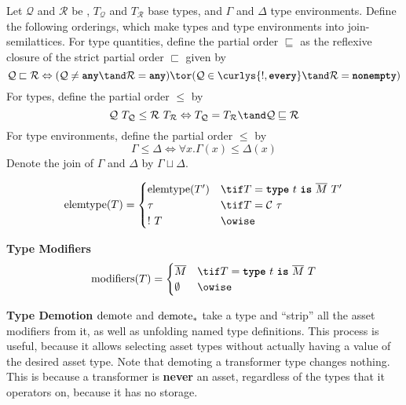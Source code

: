\documentclass[10pt]{article}
\begin{document}
\begin{definition}
    Let $\mathcal{Q}$ and $\mathcal{R}$ be \typeQuantities, $T_\mathcal{Q}$ and $T_\mathcal{R}$ base types, and $\Gamma$ and $\Delta$ type environments.
    Define the following orderings, which make types and type environments into join-semilattices.
    For type quantities, define the partial order $\sqsubseteq$ as the reflexive closure of the strict partial order $\sqsubset$ given by
    \[
        \mathcal{Q} \sqsubset \mathcal{R} \iff (\mathcal{Q} \neq \any \tand \mathcal{R} = \any) \tor (\mathcal{Q} \in \curlys{\exactlyone, \every} \tand \mathcal{R} = \nonempty)
    \]
    For types, define the partial order $\leq$ by
    \[
        \mathcal{Q}~T_\mathcal{Q} \leq \mathcal{R}~T_\mathcal{R} \iff T_\mathcal{Q} = T_\mathcal{R} \tand \mathcal{Q} \sqsubseteq \mathcal{R}
    \]
    For type environments, define the partial order $\leq$ by
    \[
        \Gamma \leq \Delta \iff \forall x. \Gamma(x) \leq \Delta(x)
    \]
    Denote the join of $\Gamma$ and $\Delta$ by $\Gamma \sqcup \Delta$.
\end{definition}

\begin{align*}
    \elemtype(T) =
    \begin{cases}
        \elemtype(T') & \tif T = \type~t~\is~\overline{M}~T' \\
        \tau & \tif T = \mathcal{C}~\tau \\
        !~T & \owise
    \end{cases}
\end{align*}

 \textbf{Type Modifiers}
\begin{align*}
    \modifiers(T) =
    \begin{cases}
        \overline{M} & \tif T = \type~t~\is~\overline{M}~T \\
        \emptyset & \owise
    \end{cases}
\end{align*}

\framebox{$\demoteT(\tau) = \sigma$}
 \textbf{Type Demotion}
$\text{demote}$ and $\text{demote}_*$ take a type and ``strip'' all the asset modifiers from it, as well as unfolding named type definitions.
This process is useful, because it allows selecting asset types without actually having a value of the desired asset type.
Note that demoting a transformer type changes nothing.
This is because a transformer is \textbf{never} an asset, regardless of the types that it operators on, because it has no storage.
\end{document}
